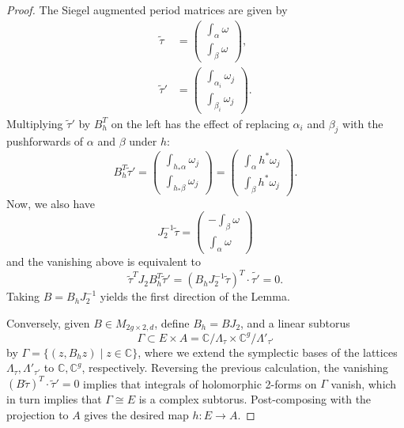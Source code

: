 \documentclass[12pt]{amsart}
\def\bC{\mathbb{C}}
\theoremstyle{definition}
\begin{document}
\begin{proof}
The Siegel augmented period matrices are given by
\begin{align*}
    \tilde{\tau} &= \begin{pmatrix} \int_\alpha \omega \\ \int_\beta \omega  \end{pmatrix},\\
    \tilde{\tau}' &= \begin{pmatrix} \int_{\alpha_i} \omega_j \\ \int_{\beta_i} \omega_j  \end{pmatrix}.
\end{align*}
Multiplying $\tilde{\tau}'$ by $B_h^T$ on the left has the effect of replacing $\alpha_i$ and $\beta_j$ with the pushforwards of $\alpha$ and $\beta$ under $h$:
\begin{equation*}
B_h^T \tilde{\tau}' = 
\begin{pmatrix} 
\int_{h_*\alpha} \omega_j \\ 
\int_{h_*\beta} \omega_j  \end{pmatrix} 
=
\begin{pmatrix} 
\int_{\alpha} h^*\omega_j \\ 
\int_{\beta} h^*\omega_j 
\end{pmatrix}
.
\end{equation*}
Now, we also have
\begin{equation*}
J_2^{-1}\tilde{\tau} 
=
\begin{pmatrix}
- \int_\beta \omega \\ 
\int_\alpha \omega 
\end{pmatrix}
\end{equation*}
and the vanishing above is equivalent to 
\begin{equation*}
    \tilde{\tau}^T J_2 B_h^T \tilde{\tau}'= (B_hJ_2^{-1}\tilde{\tau})^T\cdot \tilde{\tau'} =0.
\end{equation*}
Taking $B=B_hJ_2^{-1}$ yields the first direction of the Lemma.

Conversely, given $B\in M_{2g\times 2,d}$, define $B_h=BJ_2$, and a linear subtorus 
\begin{equation*}
    \Gamma\subset E\times A=\bC/\Lambda_\tau\times \bC^g/\Lambda'_{\tau'}
\end{equation*}
by $\Gamma=\{(z,B_hz)\mid z\in\bC\}$, where we extend the symplectic bases of the lattices $\Lambda_\tau,\Lambda'_{\tau'}$ to $\bC,\bC^g$, respectively. Reversing the previous calculation, the vanishing $(B \tilde{\tau})^T\cdot \tilde{\tau}'=0$ implies that integrals of holomorphic 2-forms on $\Gamma$ vanish, which in turn implies that $\Gamma\cong E$ is a complex subtorus. Post-composing with the projection to $A$ gives the desired map $h:E\to A$.
\end{proof}
\end{document}
